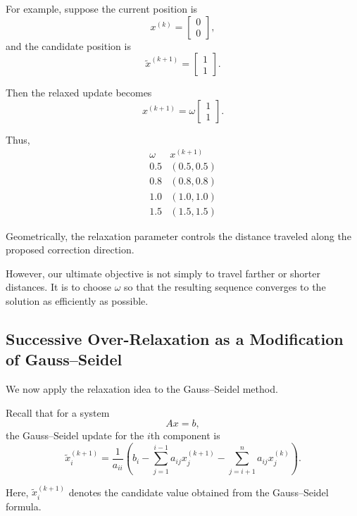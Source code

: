 \documentclass[11pt,a4paper]{article}
\theoremstyle{definition}
\theoremstyle{remark}
\begin{document}
For example, suppose the current
position is
\[
    x^{(k)}
    =
    \begin{bmatrix}
        0\\0
    \end{bmatrix},
\]
and the candidate position is
\[
    \widetilde{x}^{(k+1)}
    =
    \begin{bmatrix}
        1\\1
    \end{bmatrix}.
\]

Then the relaxed update becomes
\[
    x^{(k+1)}
    =
    \omega
    \begin{bmatrix}
        1\\1
    \end{bmatrix}.
\]

Thus,
\[
\begin{array}{c|c}
    \omega & x^{(k+1)}\\
    \hline
    0.5 & (0.5,0.5)\\
    0.8 & (0.8,0.8)\\
    1.0 & (1.0,1.0)\\
    1.5 & (1.5,1.5)
\end{array}
\]

Geometrically, the relaxation parameter
controls the distance traveled along
the proposed correction direction.

However, our ultimate objective is not
simply to travel farther or shorter
distances. It is to choose $\omega$
so that the resulting sequence converges
to the solution as efficiently as possible.


\subsection{Successive Over-Relaxation as a Modification
of Gauss--Seidel}

We now apply the relaxation idea to the
Gauss--Seidel method.

Recall that for a system
\[
    Ax=b,
\]
the Gauss--Seidel update for the
$i$th component is
\begin{equation}
    \widetilde{x}_i^{(k+1)}
    =
    \frac{1}{a_{ii}}
    \left(
        b_i
        -
        \sum_{j=1}^{i-1}
        a_{ij}x_j^{(k+1)}
        -
        \sum_{j=i+1}^{n}
        a_{ij}x_j^{(k)}
    \right).
    \label{eq:sor_gs_candidate}
\end{equation}

Here,
$\widetilde{x}_i^{(k+1)}$
denotes the candidate value obtained
from the Gauss--Seidel formula.
\end{document}
